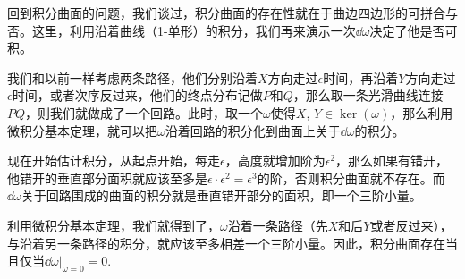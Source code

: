 \para 回到积分曲面的问题，我们谈过，积分曲面的存在性就在于曲边四边形的可拼合与否。这里，利用沿着曲线（1-单形）的积分，我们再来演示一次$\dd\omega$决定了他是否可积。

我们和以前一样考虑两条路径，他们分别沿着$X$方向走过$\epsilon$时间，再沿着$Y$方向走过$\epsilon$时间，或者次序反过来，他们的终点分布记做$P$和$Q$，那么取一条光滑曲线连接$PQ$，则我们就做成了一个回路。此时，取一个$\omega$使得$X$, $Y\in \ker(\omega)$，那么利用微积分基本定理，就可以把$\omega$沿着回路的积分化到曲面上关于$\dd \omega$的积分。

现在开始估计积分，从起点开始，每走$\epsilon$，高度就增加阶为$\epsilon^2$，那么如果有错开，他错开的垂直部分面积就应该至多是$\epsilon\cdot \epsilon^2=\epsilon^3$的阶，否则积分曲面就不存在。而$\dd \omega$关于回路围成的曲面的积分就是垂直错开部分的面积，即一个三阶小量。

利用微积分基本定理，我们就得到了，$\omega$沿着一条路径（先$X$和后$Y$或者反过来），与沿着另一条路径的积分，就应该至多相差一个三阶小量。因此，积分曲面存在当且仅当$\dd \omega|_{\omega=0}=0$.